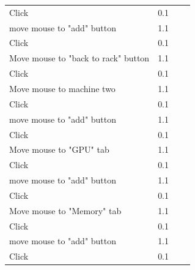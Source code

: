\documentclass[11pt]{article}
\begin{document}
\begin{table}[h!]
{\begin{tabular}{lrlr}
					Click                                    & 0.1       &                                                 &     \\
					move mouse to "add" button               & 1.1       &                                                 &     \\
					Click                                    & 0.1       &                                                 &     \\
					Move mouse to "back to rack" button      & 1.1       &                                                 &     \\
					Click                                    & 0.1       &                                                 &     \\
					Move mouse to machine two                & 1.1       &                                                 &     \\
					Click                                    & 0.1       &                                                 &     \\
					move mouse to "add" button               & 1.1       &                                                 &     \\
					Click                                    & 0.1       &                                                 &     \\
					Move mouse to "GPU" tab                  & 1.1       &                                                 &     \\
					Click                                    & 0.1       &                                                 &     \\
					move mouse to "add" button               & 1.1       &                                                 &     \\
					Click                                    & 0.1       &                                                 &     \\
					Move mouse to "Memory" tab               & 1.1       &                                                 &     \\
					Click                                    & 0.1       &                                                 &     \\
					move mouse to "add" button               & 1.1       &                                                 &     \\
					Click                                    & 0.1       &                                                 &     \\

\end{tabular}}
\end{table}
\end{document}
